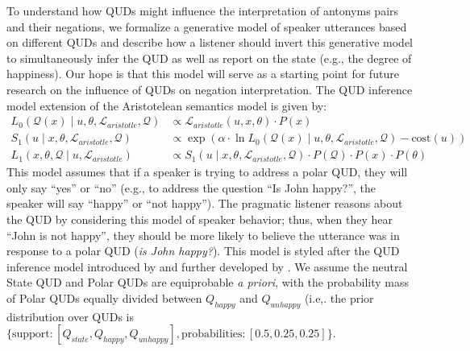 \documentclass[floatsintext,doc]{apa6}
\begin{document}
To understand how QUDs might influence the interpretation of antonyms pairs and their negations, we formalize a generative model of speaker utterances based on different QUDs and describe how a listener should invert this generative model to simultaneously infer the QUD as well as report on the state (e.g., the degree of happiness). 
Our hope is that this model will serve as a starting point for future research on the influence of QUDs on negation interpretation. 
The QUD inference model extension of the Aristotelean semantics model is given by: 
%
\begin{align}
L_{0}(\mathcal{Q}(x) \mid u, \theta, \mathcal{L}_{aristotle}, \mathcal{Q}) &\propto \mathcal{L}_{aristotle}(u, x, \theta) \cdot P(x) \label{eq:L0q} \\
S_{1}(u \mid x, \theta, \mathcal{L}_{aristotle}, \mathcal{Q}) &\propto \exp{(\alpha \cdot \ln {L_{0}(\mathcal{Q}(x) \mid u, \theta, \mathcal{L}_{aristotle}, \mathcal{Q})} - \text{cost}(u))} \label{eq:S1q}\\
L_{1}(x, \theta, \mathcal{Q} \mid u,  \mathcal{L}_{aristotle}) &\propto S_{1}(u \mid x, \theta, \mathcal{L}_{aristotle}, \mathcal{Q}) \cdot P(\mathcal{Q}) \cdot P(x) \cdot  P(\theta) \label{eq:L1q}
\end{align}
%
This model assumes that if a speaker is trying to address a polar QUD, they will only say ``yes'' or ``no'' (e.g., to address the question ``Is John happy?'', the speaker will say ``happy'' or ``not happy''). 
The pragmatic listener reasons about the QUD by considering this model of speaker behavior; thus, when they hear ``John is not happy'', they should be more likely to believe the utterance was in response to a polar QUD (\emph{is John happy?}). 
This model is styled after the QUD inference model introduced by  and further developed by .
We assume the neutral State QUD and Polar QUDs are equiprobable \emph{a priori}, with the probability mass of Polar QUDs equally divided between $Q_{happy}$ and $Q_{unhappy}$ (i.e,. the prior distribution over QUDs is $\{\text{support}: [Q_{state}, Q_{happy}, Q_{unhappy}], \text{probabilities}: [0.5, 0.25, 0.25]\}$.
\end{document}
